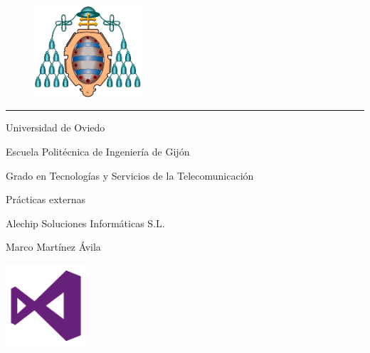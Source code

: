 \documentclass[a4paper,openright,10pt]{article}
\begin{document}
\pagestyle{empty} %
\begin{center}
\vspace*{-1.5cm}
\begin{figure}
\centering
\includegraphics[width=4cm]{uniovi.png}
\end{figure}
\vspace*{0.5cm}
\rule{80mm}{0.1mm}

\begin{Large}

Universidad de Oviedo
	
\end{Large}

Escuela Politécnica de Ingeniería de Gijón

\vspace*{3cm}

\begin{Large}

Grado en Tecnologías y Servicios de la Telecomunicación
	
\end{Large}

\vspace*{0.17cm}

Prácticas externas

\vspace*{1cm}

\begin{huge}

Alechip Soluciones Informáticas S.L.

\end{huge}

\vspace*{0.5cm}

Marco Martínez Ávila
	
\end{center}

\begin{center}
	
\vspace*{2cm}
\centering
\includegraphics[width=3cm]{logo.png}
	
	
\end{center}
\end{document}
